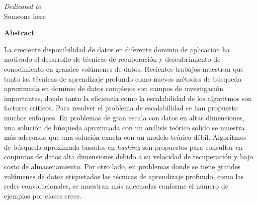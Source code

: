\newpage
\thispagestyle{empty}
\begin{center}
 \vspace*{2cm}
  \textit{\LARGE {Dedicated to}}\\ 
 Someone here
\end{center}


\newpage
\thispagestyle{empty}
\begin{center}
  \textbf{\large Abstract}
\end{center}


La creciente disponibilidad de datos en diferente dominio de aplicación ha motivado el desarrollo de técnicas de recuperación y descubrimiento de conocimiento en grandes volúmenes de datos.   Recientes trabajos muestran que tanto las técnicas de aprendizaje profundo como  nuevos métodos de búsqueda aproximada en dominio de datos complejos son campos de investigación importantes, donde tanto la eficiencia como la  escalabilidad de los algoritmos son factores críticos. Para resolver el problema de escalabilidad se han propuesto muchos enfoques. En problemas de gran escala con datos en altas dimensiones, una solución de búsqueda aproximada con un análisis teórico solido se muestra más adecuado que una solución exacta con un modelo teórico débil.    Algoritmos de búsqueda aproximada  basados en \textit{hashing} son propuestos para consultar en conjuntos de datos  alta dimensiones debido a su velocidad de recuperación y bajo costo de almacenamiento.  Por otro lado, en problemas donde se tiene grandes volúmenes de datos etiquetados las técnicas de aprendizaje profundo, como las redes convolucionales, se muestran más adecuadas conforme el número de ejemplos por clases crece.

